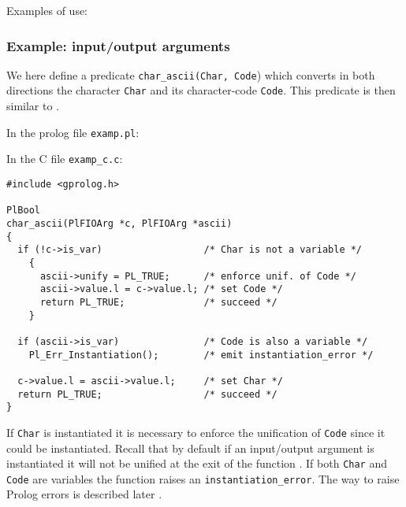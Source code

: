 Examples of use:

\begin{CodeTwoCols}
\SkipLine
{}
\SkipLine
{}
\SkipLine
{}
\SkipLine
{}
\end{CodeTwoCols}

\subsubsection{Example: input/output arguments}
We here define a predicate \texttt{char\_ascii(Char, Code}) which converts
in both directions the character \texttt{Char} and its character-code
\texttt{Code}. This predicate is then similar to 
.

In the prolog file \texttt{examp.pl}:


In the C file \texttt{examp\_c.c}:

\begin{Indentation}
\begin{verbatim}
#include <gprolog.h>

PlBool
char_ascii(PlFIOArg *c, PlFIOArg *ascii)
{
  if (!c->is_var)                  /* Char is not a variable */
    {
      ascii->unify = PL_TRUE;      /* enforce unif. of Code */
      ascii->value.l = c->value.l; /* set Code */
      return PL_TRUE;              /* succeed */
    }

  if (ascii->is_var)               /* Code is also a variable */
    Pl_Err_Instantiation();        /* emit instantiation_error */

  c->value.l = ascii->value.l;     /* set Char */
  return PL_TRUE;                  /* succeed */
}
\end{verbatim}
\end{Indentation}

If \texttt{Char} is instantiated it is necessary to enforce the unification
of \texttt{Code} since it could be instantiated. Recall that by default if
an input/output argument is instantiated it will not be unified at the exit
of the function . If both \texttt{Char} and
\texttt{Code} are variables the function raises an
\texttt{instantiation\_error}. The way to raise Prolog errors is described
later .

